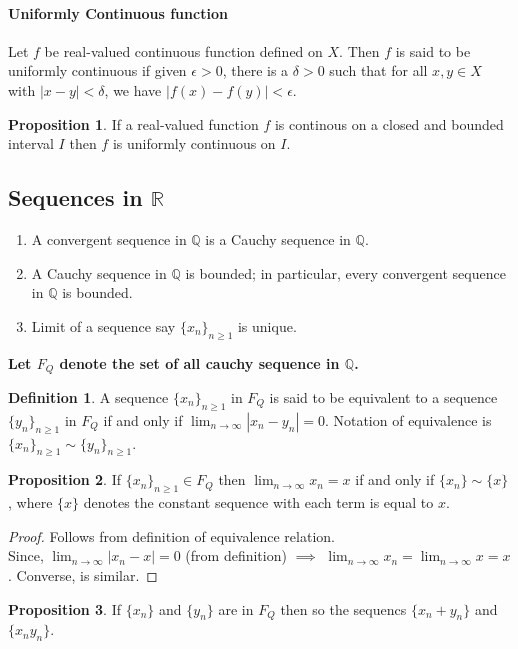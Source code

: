 \documentclass[12pt]{report}
\theoremstyle{definition}
\newtheorem{defn}{Definition}
\newtheorem{prop}{Proposition}
\begin{document}
\paragraph*{Uniformly Continuous function}
Let $f$ be real-valued continuous function defined on $X$. Then $f$ is said to be uniformly continuous if given $\epsilon > 0$, there is a $\delta > 0$ such that for all $x,y \in X$ with $|x - y| < \delta$, we have $|f(x) - f(y)| < \epsilon$.
\begin{prop}
    If a real-valued function $f$ is continous on a closed and bounded interval $I$ then $f$ is uniformly continuous on $I$.
\end{prop}
\subsection*{Sequences in $\mathbb{R}$}
\begin{enumerate}
    \item A convergent sequence in $\mathbb{Q}$ is a Cauchy sequence in $\mathbb{Q}$.
    \item A Cauchy sequence in $\mathbb{Q}$ is bounded; in particular, every convergent sequence in $\mathbb{Q}$ is bounded.
    \item Limit of a sequence say $\{x_n\}_{n \geq 1}$ is unique.
\end{enumerate}
\textbf{Let $F_Q$ denote the set of all cauchy sequence in $\mathbb{Q}$.}
\begin{defn}
    A sequence $\{x_n\}_{n \geq 1}$ in $F_Q$ is said to be equivalent to a sequence $\{y_n\}_{n \geq 1}$ in $F_Q$ if and only if $\lim_{n \to \infty}|x_n - y_n| = 0$. Notation of equivalence is $\{x_n\}_{n \geq 1} \sim \{y_n\}_{n \geq 1}$.
\end{defn}
\begin{prop}
    If $\{x_n\}_{n\geq 1} \in F_Q$ then $\lim_{n \to \infty} x_n = x$ if and only if $\{x_n\} \sim \{x\}$, where $\{x\}$ denotes the constant sequence with each term is equal to $x$. 
\end{prop}
\begin{proof}
    Follows from definition of equivalence relation.\\
    Since, $\lim_{n \to \infty} |x_n - x| = 0$ (from definition) $\implies$ $\lim_{n \to \infty} x_n =  \lim_{n \to \infty} x = x$. Converse, is similar. 
\end{proof}
\begin{prop}
    If $\{x_n\}$ and $\{y_n\}$ are in $F_Q$ then so the sequencs $\{x_n + y_n\}$ and $\{x_ny_n\}$.
\end{prop}
\end{document}
